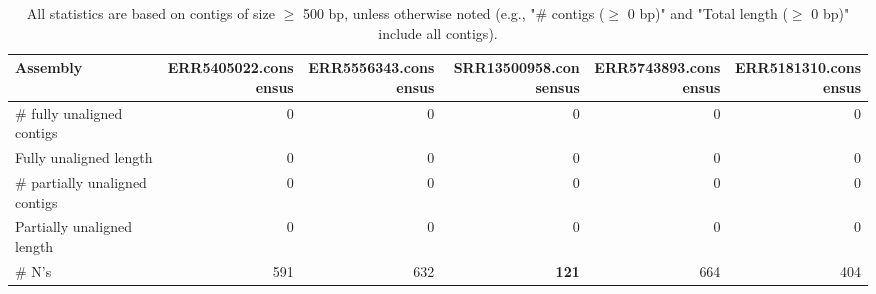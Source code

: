 \documentclass[12pt,a4paper]{article}
\begin{document}
\begin{table}[ht]
\begin{center}
\caption{All statistics are based on contigs of size $\geq$ 500 bp, unless otherwise noted (e.g., "\# contigs ($\geq$ 0 bp)" and "Total length ($\geq$ 0 bp)" include all contigs).}
\begin{tabular}{|l*{5}{|r}|}
\hline
Assembly & ERR5405022.consensus & ERR5556343.consensus & SRR13500958.consensus & ERR5743893.consensus & ERR5181310.consensus \\ \hline
\# fully unaligned contigs & 0 & 0 & 0 & 0 & 0 \\ \hline
Fully unaligned length & 0 & 0 & 0 & 0 & 0 \\ \hline
\# partially unaligned contigs & 0 & 0 & 0 & 0 & 0 \\ \hline
Partially unaligned length & 0 & 0 & 0 & 0 & 0 \\ \hline
\# N's & 591 & 632 & {\bf 121} & 664 & 404 \\ \hline
\end{tabular}
\end{center}
\end{table}
\end{document}
